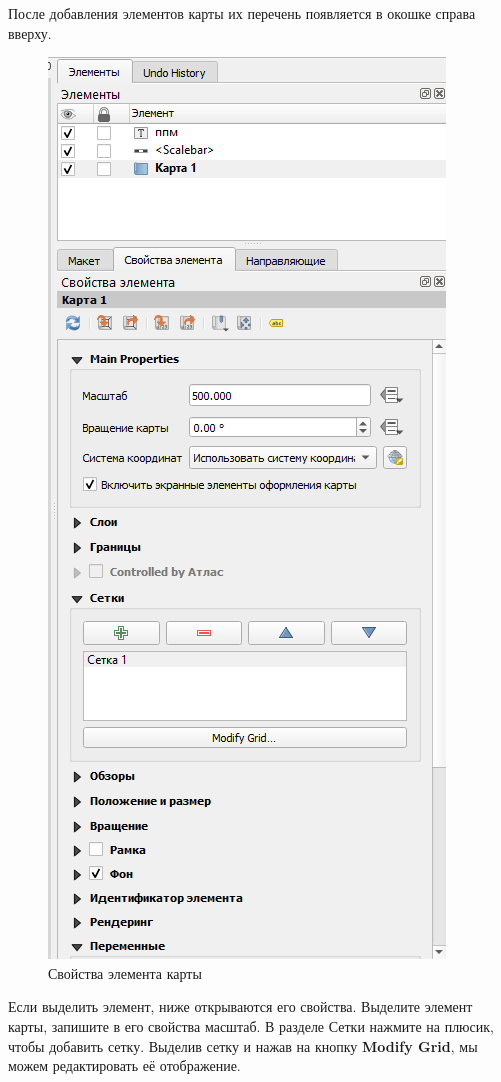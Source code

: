 \documentclass[
  12pt,
]{book}
\begin{document}
После добавления элементов карты их перечень появляется в окошке справа вверху.

\begin{figure}
\centering
\includegraphics{images/symbology/Element_properties.png}
\caption{Свойства элемента карты}
\end{figure}

Если выделить элемент, ниже открываются его свойства. Выделите элемент карты, запишите в его свойства масштаб. В разделе Сетки нажмите на плюсик, чтобы добавить сетку. Выделив сетку и нажав на кнопку \textbf{Modify Grid}, мы можем редактировать её отображение.
\end{document}
